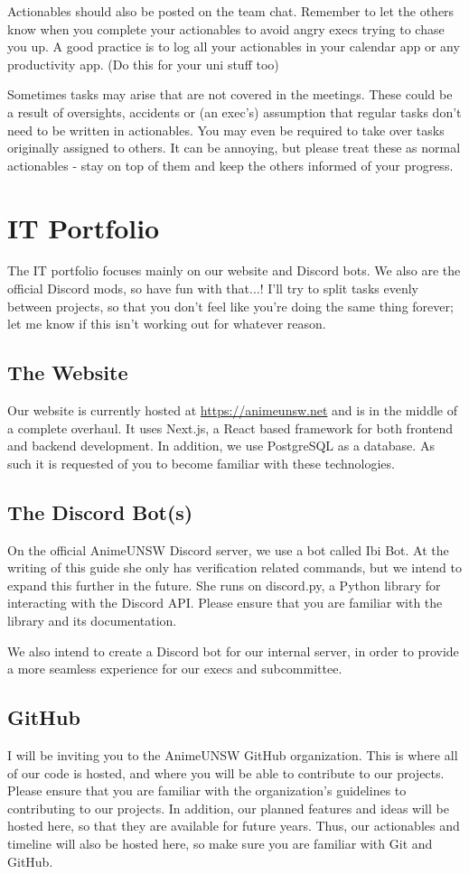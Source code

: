 \documentclass{article}
\begin{document}
Actionables should also be posted on the team chat. Remember to let the others know when you complete your actionables to avoid angry execs trying to chase you up. A good practice is to log all your actionables in your calendar app or any productivity app. (Do this for your uni stuff too)

Sometimes tasks may arise that are not covered in the meetings. These could be a result of oversights, accidents or (an exec’s) assumption that regular tasks don’t need to be written in actionables. You may even be required to take over tasks originally assigned to others. It can be annoying, but please treat these as normal actionables - stay on top of them and keep the others informed of your progress.
\section{IT Portfolio}
The IT portfolio focuses mainly on our website and Discord bots. We also are the official Discord mods, so have fun with that...! I'll try to split tasks evenly between projects, so that you don't feel like you're doing the same thing forever; let me know if this isn't working out for whatever reason.
\subsection{The Website}
Our website is currently hosted at \url{https://animeunsw.net} and is in the middle of a complete overhaul. It uses Next.js, a React based framework for both frontend and backend development. In addition, we use PostgreSQL as a database. As such it is requested of you to become familiar with these technologies.
\subsection{The Discord Bot(s)}
On the official AnimeUNSW Discord server, we use a bot called Ibi Bot. At the writing of this guide she only has verification related commands, but we intend to expand this further in the future. She runs on discord.py, a Python library for interacting with the Discord API. Please ensure that you are familiar with the library and its documentation.

We also intend to create a Discord bot for our internal server, in order to provide a more seamless experience for our execs and subcommittee.
\subsection{GitHub}
I will be inviting you to the AnimeUNSW GitHub organization. This is where all of our code is hosted, and where you will be able to contribute to our projects. Please ensure that you are familiar with the organization's guidelines to contributing to our projects. In addition, our planned features and ideas will be hosted here, so that they are available for future years. Thus, our actionables and timeline will also be hosted here, so make sure you are familiar with Git and GitHub.
\end{document}
